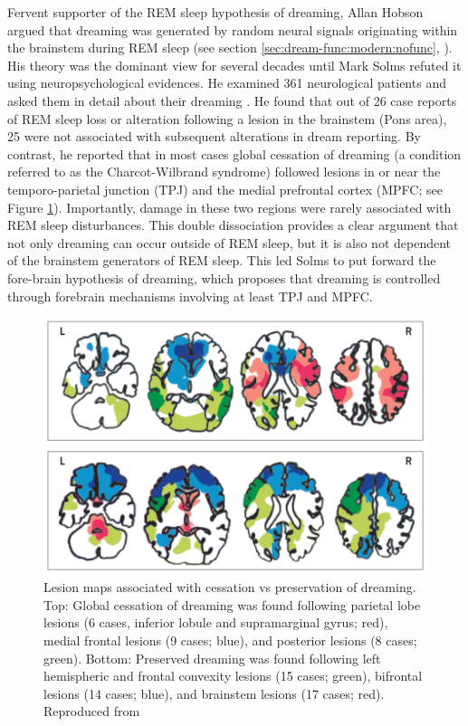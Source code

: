 Fervent supporter of the REM sleep hypothesis of dreaming, Allan Hobson argued that dreaming was generated by random neural signals originating within the brainstem during REM sleep (see section \ref{sec:dream-func:modern:nofunc}, \citealp{hobson_dream_1998}). His theory was the dominant view for several decades until Mark Solms refuted it using neuropsychological evidences. He examined 361 neurological patients and asked them in detail about their dreaming \cite{solms_neuropsychology_1997}. He found that out of 26 case reports of REM sleep loss or alteration following a lesion in the brainstem (Pons area), 25 were not associated with subsequent alterations in dream reporting. By contrast, he reported that in most cases global cessation of dreaming (a condition referred to as the Charcot-Wilbrand syndrome) followed lesions in or near the temporo-parietal junction (TPJ) and the medial prefrontal cortex (MPFC; see Figure \ref{fig:intro:lesions}). Importantly, damage in these two regions were rarely associated with REM sleep disturbances. This double dissociation provides a clear argument that not only dreaming can occur outside of REM sleep, but it is also not dependent of the brainstem generators of REM sleep. This led Solms to put forward the fore-brain hypothesis of dreaming, which proposes that dreaming is controlled through forebrain mechanisms involving at least TPJ and MPFC.

\begin{figure}[htb]
	\includegraphics[width=\textwidth]{Fig/Intro/Intro_Lesions/Intro_Lesions.png}
	\caption[Lesion maps associated with cessation vs preservation of dreaming]{Lesion maps associated with cessation vs preservation of dreaming. Top: Global cessation of dreaming was found following parietal lobe lesions (6 cases, inferior lobule and supramarginal gyrus; red), medial frontal lesions (9 cases; blue), and posterior lesions (8 cases; green). Bottom: Preserved dreaming was found following left hemispheric and frontal convexity lesions (15 cases; green), bifrontal lesions (14 cases; blue), and brainstem lesions (17 cases; red). Reproduced from \citet{schwartz_dreaming:_2005}}
	\label{fig:intro:lesions}
\end{figure}

